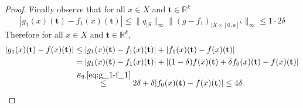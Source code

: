 \documentclass[10pt,a4paper]{amsart}
\def\Rk{\mathbb{R}^k}
\def\tt{\mathbf t}
\begin{document}
\begin{proof}
          Finally observe that for all $x\in X$ and $\tt\in\Rk$
    \begin{equation}\label{eq:g_1-f_1}
        |g_1(x)(\tt)-f_1(x)(\tt)|\leq \|q_{|S}\|_{\infty} \|(g-f_1)_{|X\times [0,a]^k}\|_{\infty}\leq 1\cdot 2\delta
    \end{equation}
      Therefore for all $x\in X$ and $\mathbf t\in\Rk$,
    \begin{equation}\label{eq:g_1-f}
        \begin{split}
            |g_1(x)(\tt)-f(x)(\tt)|&\leq |g_1(x)(\tt)-f_1(x)(\tt)|+|f_1(x)(\tt)-f(x)(\tt)|\\
            &=|g_1(x)(\tt)-f_1(x)(\tt)|+|(1-\delta)f(x)(\tt)+\delta f_0(x)(\tt)-f(x)(\tt)|\\
            &\stackrel{Eq. \eqref{eq:g_1-f_1}}{\leq}2\delta+\delta|f_0(x)(\tt)-f(x)(\tt)|\leq 4\delta.
        \end{split}
    \end{equation}
    \end{proof}
\end{document}
